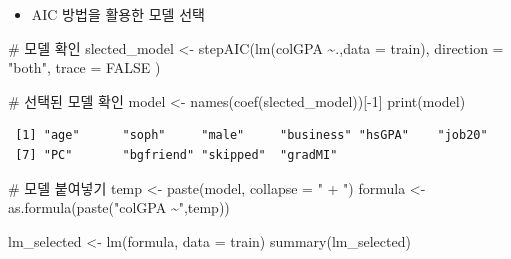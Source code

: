 \documentclass[
  letterpaper,
  DIV=11,
  numbers=noendperiod]{scrartcl}
\newenvironment{Shaded}{\begin{snugshade}}{\end{snugshade}}
\newcommand{\AttributeTok}[1]{\textcolor[rgb]{0.40,0.45,0.13}{#1}}
\newcommand{\CommentTok}[1]{\textcolor[rgb]{0.37,0.37,0.37}{#1}}
\newcommand{\ConstantTok}[1]{\textcolor[rgb]{0.56,0.35,0.01}{#1}}
\newcommand{\DecValTok}[1]{\textcolor[rgb]{0.68,0.00,0.00}{#1}}
\newcommand{\FunctionTok}[1]{\textcolor[rgb]{0.28,0.35,0.67}{#1}}
\newcommand{\NormalTok}[1]{\textcolor[rgb]{0.00,0.23,0.31}{#1}}
\newcommand{\OtherTok}[1]{\textcolor[rgb]{0.00,0.23,0.31}{#1}}
\newcommand{\SpecialCharTok}[1]{\textcolor[rgb]{0.37,0.37,0.37}{#1}}
\newcommand{\StringTok}[1]{\textcolor[rgb]{0.13,0.47,0.30}{#1}}
\providecommand{\tightlist}{%
  \setlength{\itemsep}{0pt}\setlength{\parskip}{0pt}}\usepackage{longtable,booktabs,array}
\begin{document}
\begin{itemize}
\tightlist
\item
  AIC 방법을 활용한 모델 선택
\end{itemize}

\begin{Shaded}
\begin{Highlighting}[]
\CommentTok{\# 모델 확인 }
\NormalTok{slected\_model }\OtherTok{\textless{}{-}}  \FunctionTok{stepAIC}\NormalTok{(}\FunctionTok{lm}\NormalTok{(colGPA }\SpecialCharTok{\textasciitilde{}}\NormalTok{.,}\AttributeTok{data =}\NormalTok{ train),}
                          \AttributeTok{direction =} \StringTok{"both"}\NormalTok{,}
                          \AttributeTok{trace =} \ConstantTok{FALSE}
\NormalTok{                          )}

\CommentTok{\# 선택된 모델 확인}
\NormalTok{model }\OtherTok{\textless{}{-}} \FunctionTok{names}\NormalTok{(}\FunctionTok{coef}\NormalTok{(slected\_model))[}\SpecialCharTok{{-}}\DecValTok{1}\NormalTok{]}
\FunctionTok{print}\NormalTok{(model)}
\end{Highlighting}
\end{Shaded}

\begin{verbatim}
 [1] "age"      "soph"     "male"     "business" "hsGPA"    "job20"   
 [7] "PC"       "bgfriend" "skipped"  "gradMI"  
\end{verbatim}

\begin{Shaded}
\begin{Highlighting}[]
\CommentTok{\# 모델 붙여넣기 }
\NormalTok{temp }\OtherTok{\textless{}{-}} \FunctionTok{paste}\NormalTok{(model, }\AttributeTok{collapse =} \StringTok{" + "}\NormalTok{)}
\NormalTok{formula }\OtherTok{\textless{}{-}}\FunctionTok{as.formula}\NormalTok{(}\FunctionTok{paste}\NormalTok{(}\StringTok{"colGPA \textasciitilde{}"}\NormalTok{,temp))}

\NormalTok{lm\_selected }\OtherTok{\textless{}{-}} \FunctionTok{lm}\NormalTok{(formula, }\AttributeTok{data =}\NormalTok{ train)}
\FunctionTok{summary}\NormalTok{(lm\_selected)}
\end{Highlighting}
\end{Shaded}
\end{document}
